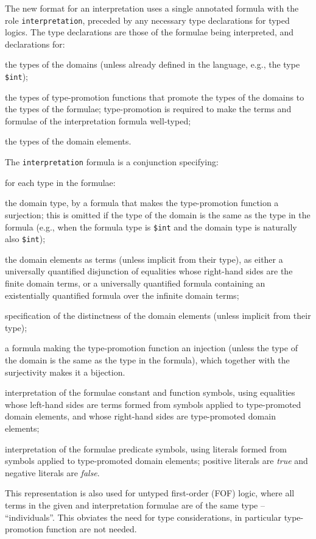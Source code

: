 \documentclass[letterpaper]{article}
\newcommand{\smalltt}[1]{\small \texttt{#1}}
\newenvironment{packed_itemize}{
\vspace*{-0.2em}
\begin{itemize}
\setlength{\partopsep}{0pt}
\setlength{\itemsep}{1pt}
\setlength{\parskip}{0pt}
\setlength{\parsep}{0pt}
}{\end{itemize}}
\begin{document}
The new format for an interpretation uses a single annotated formula with the role 
\smalltt{interpretation}, preceded by any necessary type declarations for typed logics.
The type declarations are those of the formulae being interpreted, and declarations for:
\begin{packed_itemize}
\item the types of the domains (unless already defined in the language, e.g., the type
      \smalltt{\$int});
\item the types of type-promotion functions that promote the types of the domains to the types 
      of the formulae; type-promotion is required to make the terms and formulae of the
      interpretation formula well-typed;
\item the types of the domain elements.
\end{packed_itemize}
The \smalltt{interpretation} formula is a conjunction specifying: 
\begin{packed_itemize}
\item for each type in the formulae:
      \begin{packed_itemize}
      \item the domain type, by a formula that makes the type-promotion function a surjection; 
            this is omitted if the type of the domain is the same as the type in the formula
            (e.g., when the formula type is \smalltt{\$int} and the domain type is naturally 
            also \smalltt{\$int});
      \item the domain elements as terms (unless implicit from their type), as either a 
            universally quantified disjunction of equalities whose right-hand sides are the
            finite domain terms, or a universally quantified formula containing an existentially
            quantified formula over the infinite domain terms;
      \item specification of the distinctness of the domain elements (unless implicit from their
            type);
      \item a formula making the type-promotion function an injection (unless the type of the 
            domain is the same as the type in the formula), which together with the surjectivity 
            makes it a bijection.
      \end{packed_itemize}
\item interpretation of the formulae constant and function symbols, using equalities whose 
      left-hand sides are terms formed from symbols applied to type-promoted domain elements, 
      and whose right-hand sides are type-promoted domain elements;
\item interpretation of the formulae predicate symbols, using literals formed from symbols applied
      to type-promoted domain elements; positive literals are {\em true} and negative literals 
      are {\em false}.
\end{packed_itemize}
This representation is also used for untyped first-order (FOF) logic, where all terms in the given 
and interpretation formulae are of the same type – ``individuals''. 
This obviates the need for type considerations, in particular type-promotion function are not 
needed.
\end{document}

